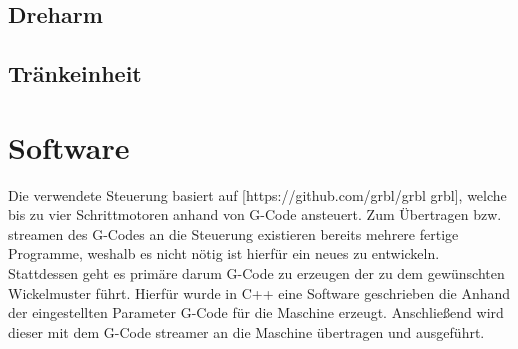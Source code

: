 \documentclass[12pt, a4paper, ngerman]{article}
\begin{document}
\subsection{Dreharm}

\subsection{Tränkeinheit}



\section{Software}
Die verwendete Steuerung basiert auf [https://github.com/grbl/grbl grbl], welche bis zu vier Schrittmotoren anhand von G-Code ansteuert. Zum Übertragen bzw. streamen des G-Codes an die Steuerung existieren bereits mehrere fertige Programme, weshalb es nicht nötig ist hierfür ein neues zu entwickeln. Stattdessen geht es primäre darum G-Code zu erzeugen der zu dem gewünschten Wickelmuster führt. Hierfür wurde in C++ eine Software geschrieben die Anhand der eingestellten Parameter G-Code für die Maschine erzeugt. Anschließend wird dieser mit dem G-Code streamer an die Maschine übertragen und ausgeführt.
\end{document}

